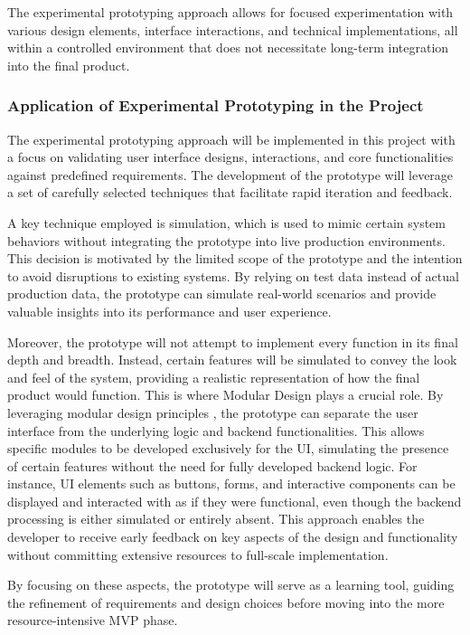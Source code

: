 The experimental prototyping approach allows for focused experimentation with various design elements, interface
interactions, and technical implementations, all within a controlled environment that does not necessitate long-term
integration into the final product.

\subsubsection{Application of Experimental Prototyping in the Project}\label{subsubsec:ptapplication}

The experimental prototyping approach will be implemented in this project with a focus on validating user interface
designs, interactions, and core functionalities against predefined requirements. The development of the prototype will
leverage a set of carefully selected techniques that facilitate rapid iteration and feedback.

A key technique employed is simulation, which is used to mimic certain system behaviors without integrating the
prototype into live production environments. This decision is motivated by the limited scope of the prototype and the
intention to avoid disruptions to existing systems. By relying on test data instead of actual production data, the
prototype can simulate real-world scenarios and provide valuable insights into its performance and user experience.

Moreover, the prototype will not attempt to implement every function in its final depth and breadth. Instead, certain
features will be simulated to convey the look and feel of the system, providing a realistic representation of how the
final product would function. This is where Modular Design plays a crucial role. By leveraging modular design principles
, the prototype can separate the user interface from the underlying logic and backend functionalities. This allows
specific modules to be developed exclusively for the UI, simulating the presence of certain features without the need
for fully developed backend logic. For instance, UI elements such as buttons, forms, and interactive components can be
displayed and interacted with as if they were functional, even though the backend processing is either simulated or
entirely absent. This approach enables the developer to receive early feedback on key aspects of the
design and functionality without committing extensive resources to full-scale implementation.

By focusing on these aspects, the prototype will serve as a learning tool, guiding the refinement of requirements and
design choices before moving into the more resource-intensive MVP phase.
